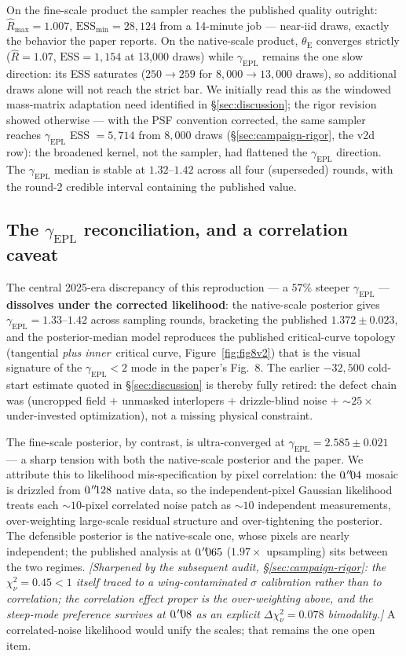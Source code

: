 \documentclass[11pt,letterpaper]{article}
\newcommand{\thetaE}{\ensuremath{\theta_{\mathrm{E}}}}
\newcommand{\gammaEPL}{\ensuremath{\gamma_{\mathrm{EPL}}}}
\begin{document}
On the fine-scale product the sampler reaches the published quality
outright: $\hat R_{\max}=1.007$, $\mathrm{ESS}_{\min}=28{,}124$ from a
14-minute job --- near-iid draws, exactly the behavior the paper
reports. On the native-scale product, $\thetaE$ converges strictly
($\hat R=1.07$, $\mathrm{ESS}=1{,}154$ at 13{,}000 draws) while
$\gammaEPL$ remains the one slow direction: its ESS saturates
($250\to259$ for $8{,}000\to13{,}000$ draws), so additional draws alone
will not reach the strict bar. We initially read this as the windowed
mass-matrix adaptation need identified in \S\ref{sec:discussion}; the
rigor revision showed otherwise --- with the PSF convention corrected,
the same sampler reaches $\gammaEPL$ ESS $=5{,}714$ from $8{,}000$
draws (\S\ref{sec:campaign-rigor}, the v2d row): the broadened kernel,
not the sampler, had flattened the $\gammaEPL$ direction. The
$\gammaEPL$ median is stable at $1.32$--$1.42$ across all four
(superseded) rounds, with the round-2 credible interval containing the
published value.

\subsection{The $\gammaEPL$ reconciliation, and a correlation caveat}
\label{sec:campaign-gamma}

The central 2025-era discrepancy of this reproduction --- a $57\%$
steeper $\gammaEPL$ --- {\bf dissolves under the corrected likelihood}:
the native-scale posterior gives $\gammaEPL=1.33$--$1.42$ across
sampling rounds, bracketing the published $1.372\pm0.023$, and the
posterior-median model reproduces the published critical-curve topology
(tangential {\it plus inner}\ critical curve,
Figure~\ref{fig:fig8v2}) that is the visual signature of the
$\gammaEPL<2$ mode in the paper's Fig.~8. The earlier $-32{,}500$
cold-start estimate quoted in \S\ref{sec:discussion} is thereby fully
retired: the defect chain was (uncropped field $+$ unmasked interlopers
$+$ drizzle-blind noise $+$ $\sim$$25\times$ under-invested
optimization), not a missing physical constraint.

The fine-scale posterior, by contrast, is ultra-converged at
$\gammaEPL=2.585\pm0.021$ --- a sharp tension with both the native-scale
posterior and the paper. We attribute this to likelihood
mis-specification by pixel correlation: the $0\mbox{$\!\!\,.{}^{\prime\prime}\!\!\,$}04$ mosaic is
drizzled from $0\mbox{$\!\!\,.{}^{\prime\prime}\!\!\,$}128$ native data, so the independent-pixel
Gaussian likelihood treats each $\sim$$10$-pixel correlated noise patch
as $\sim$$10$ independent measurements, over-weighting large-scale
residual structure and over-tightening the posterior. The defensible
posterior is the native-scale one, whose pixels are nearly independent;
the published analysis at $0\mbox{$\!\!\,.{}^{\prime\prime}\!\!\,$}065$ ($1.97\times$ upsampling) sits
between the two regimes. {\it [Sharpened by the subsequent audit,
\S\ref{sec:campaign-rigor}: the $\chi^{2}_{\nu}=0.45<1$ itself traced
to a wing-contaminated $\sigma$ calibration rather than to correlation;
the correlation effect proper is the over-weighting above, and the
steep-mode preference survives at $0\mbox{$\!\!\,.{}^{\prime\prime}\!\!\,$}08$ as an explicit
$\Delta\chi^{2}_{\nu}=0.078$ bimodality.]} A correlated-noise
likelihood would unify the scales; that remains the one open item.
\end{document}
